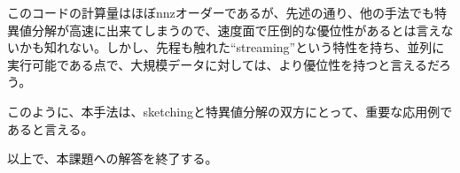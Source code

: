 \documentclass[10pt]{article}
\begin{document}
このコードの計算量はほぼnnzオーダーであるが、先述の通り、他の手法でも特異値分解が高速に出来てしまうので、速度面で圧倒的な優位性があるとは言えないかも知れない。しかし、先程も触れた``streaming''という特性を持ち、並列に実行可能である点で、大規模データに対しては、より優位性を持つと言えるだろう。

このように、本手法は、sketchingと特異値分解の双方にとって、重要な応用例であると言える。

以上で、本課題への解答を終了する。

\newpage



\end{document}
